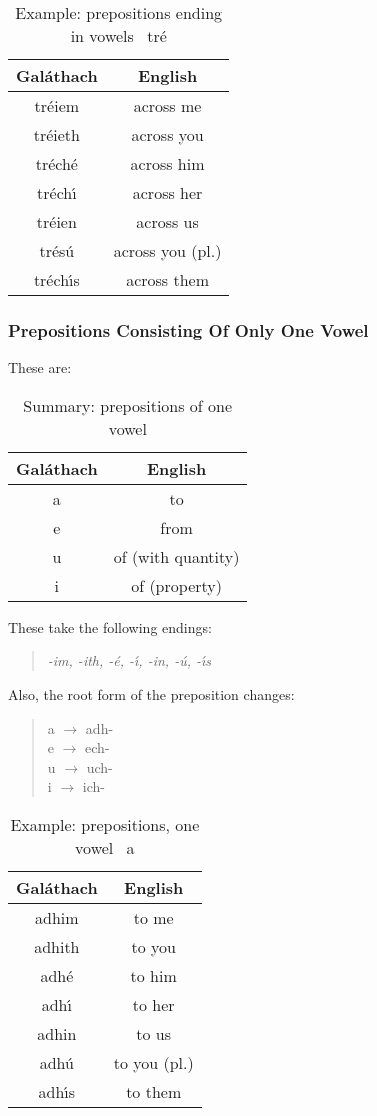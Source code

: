 \begin{table}[H]
\centering
\begin{tabular}{c|c}
  \textbf{Gal\'{a}thach} & \textbf{English}\\
  \toprule
  tr\'{e}iem & across me\\
  tr\'{e}ieth & across you\\
  tr\'{e}ch\'{e} & across him\\
  tr\'{e}ch\'{\i} & across her\\
  tr\'{e}ien & across us\\
  tr\'{e}s\'{u} & across you (pl.)\\
  tr\'{e}ch\'{\i}s & across them
\end{tabular}
\caption{Example: prepositions ending in vowels \textendash\ tr\'{e}}
\label{example_prepositions_ending_in_vowels_tre}
\end{table}

\subsubsection{Prepositions Consisting Of Only One Vowel}

These are:
\begin{table}[H]
\centering
\begin{tabular}{c|c}
  \textbf{Gal\'{a}thach} & \textbf{English}\\
  \toprule
  a & to\\
  e & from\\
  u & of (with quantity)\\
  i & of (property)
\end{tabular}
\caption{Summary: prepositions of one vowel}
\label{summary_prepositions_of_one_vowel}
\end{table}

These take the following endings:
\begin{quote}
\textit{-im, -ith, -\'{e}, -\'{\i}, -in, -\'{u}, -\'{\i}s}
\end{quote}

Also, the root form of the preposition changes:
\begin{quote}
a $\rightarrow$ adh-\\
e $\rightarrow$ ech-\\
u $\rightarrow$ uch-\\
i $\rightarrow$ ich-
\end{quote}

\begin{table}[H]
\centering
\begin{tabular}{c|c}
  \textbf{Gal\'{a}thach} & \textbf{English}\\
  \toprule
  adhim & to me\\
  adhith & to you\\
  adh\'{e} & to him\\
  adh\'{\i} & to her\\
  adhin & to us\\
  adh\'{u} & to you (pl.)\\
  adh\'{\i}s & to them
\end{tabular}
\caption{Example: prepositions, one vowel \textendash\ a}
\label{example_prepositions_one_vowel_a}
\end{table}

